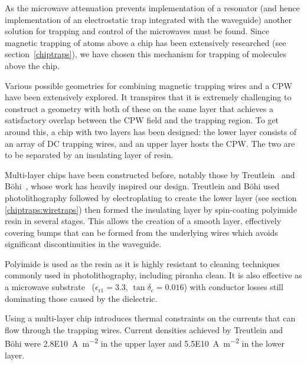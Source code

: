 As the microwave attenuation prevents implementation of a resonator (and hence
implementation of an electrostatic trap integrated with the waveguide) another
solution for trapping and control of the microwaves must be found. Since
magnetic trapping of atoms above a chip has been extensively researched (see
section~\ref{chiptraps}), we have chosen this mechanism for trapping of molecules
above the chip.

Various possible geometries for combining magnetic trapping wires and a CPW have
been extensively explored. It transpires that it is extremely challenging to
construct a geometry with both of these on the same layer that achieves a
satisfactory overlap between the CPW field and the trapping region. To get
around this, a chip with two layers has been designed: the lower layer consists
of an array of DC trapping wires, and an upper layer hosts the CPW. The two are
to be separated by an insulating layer of resin.

Multi-layer chips have been constructed before, notably those by
Treutlein~\cite{Treutlein2008} and B\"ohi~\cite{rohtua}, whose work has heavily
inspired our design. Treutlein and B\"ohi used photolithography followed by
electroplating to create the lower layer (see section \ref{chiptraps:wiretraps})
then formed the insulating layer by spin-coating polyimide resin in several
stages. This allows the creation of a smooth layer, effectively covering bumps
that can be formed from the underlying wires which avoids significant
discontinuities in the waveguide.

Polyimide is used as the resin as it is highly resistant to cleaning techniques
commonly used in photolithography, including piranha clean.  It is also
effective as a microwave substrate~\cite{Simons2004} 
($\epsilon_\mathrm{r1} = 3.3$, $\tan\delta_e = 0.016$) with conductor losses
still dominating those caused by the dielectric.

Using a multi-layer chip introduces thermal constraints on the currents that can
flow through the trapping wires. Current densities achieved by Treutlein and
B\"ohi \cite{} were \SI{2.8E10}{\ampere\per\metre\squared} in the upper layer and
\SI{5.5E10}{\ampere\per\metre\squared} in the lower layer.

